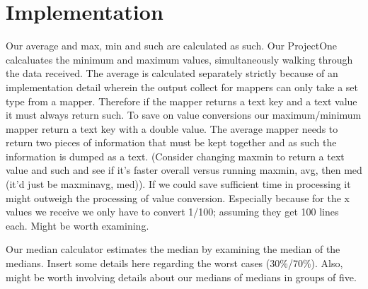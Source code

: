 \documentclass[11pt]{article}
\begin{document}
\section{Implementation}
Our average and max, min and such are calculated as such.  Our ProjectOne calcaluates the minimum and maximum values, simultaneously walking through the data received.  The average is calculated separately strictly because of an implementation detail wherein the output collect for mappers can only take a set type from a mapper.  Therefore if the mapper returns a text key and a text value it must always return such.  To save on value conversions our maximum/minimum mapper return a text key with a double value.  The average mapper needs to return two pieces of information that must be kept together and as such the information is dumped as a text.  (Consider changing maxmin to return a text value and such and see if it's faster overall versus running maxmin, avg, then med (it'd just be maxminavg, med)).  If we could save sufficient time in processing it might outweigh the processing of value conversion.  Especially because for the x values we receive we only have to convert 1/100; assuming they get 100 lines each.  Might be worth examining.

Our median calculator estimates the median by examining the median of the medians.  Insert some details here regarding the worst cases (30\%/70\%).  Also, might be worth involving details about our medians of medians in groups of five.
\end{document}
